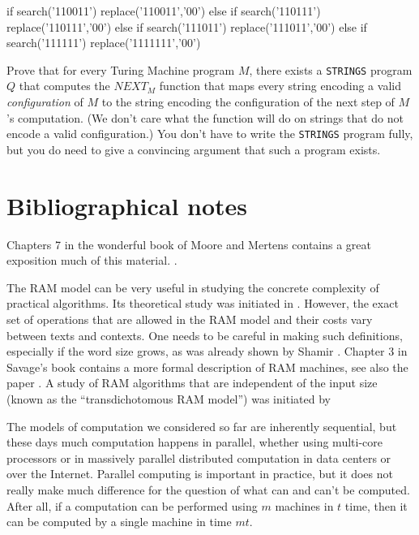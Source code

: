\begin{exercise}
\begin{code}
if search('110011') {
    replace('110011','00')
} else if search('110111') {
    replace('110111','00')
} else if search('111011') {
    replace('111011','00')
} else if search('111111') {
    replace('1111111','00')
}
\end{code}

Prove that for every Turing Machine program \(M\), there exists a
\texttt{STRINGS} program \(Q\) that computes the
\(\ensuremath{\mathit{NEXT}}_M\) function that maps every string
encoding a valid \emph{configuration} of \(M\) to the string encoding
the configuration of the next step of \(M\)'s computation. (We don't
care what the function will do on strings that do not encode a valid
configuration.) You don't have to write the \texttt{STRINGS} program
fully, but you do need to give a convincing argument that such a program
exists.

\end{exercise}

\section{Bibliographical notes}\label{othermodelsbibnotes}

Chapters 7 in the wonderful book of Moore and Mertens
\cite{MooreMertens11} contains a great exposition much of this material.
.

The RAM model can be very useful in studying the concrete complexity of
practical algorithms. Its theoretical study was initiated in
\cite{cook1973time}. However, the exact set of operations that are
allowed in the RAM model and their costs vary between texts and
contexts. One needs to be careful in making such definitions, especially
if the word size grows, as was already shown by Shamir
\cite{shamir1979}. Chapter 3 in Savage's book \cite{Savage1998models}
contains a more formal description of RAM machines, see also the paper
\cite{hagerup1998}. A study of RAM algorithms that are independent of
the input size (known as the ``transdichotomous RAM model'') was
initiated by \cite{fredman1993}

The models of computation we considered so far are inherently
sequential, but these days much computation happens in parallel, whether
using multi-core processors or in massively parallel distributed
computation in data centers or over the Internet. Parallel computing is
important in practice, but it does not really make much difference for
the question of what can and can't be computed. After all, if a
computation can be performed using \(m\) machines in \(t\) time, then it
can be computed by a single machine in time \(mt\).

